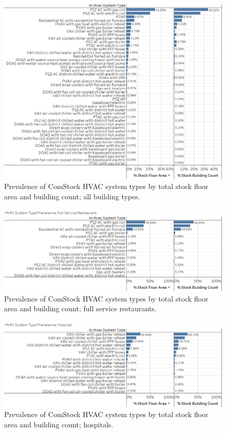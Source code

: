 \begin{figure}
    \centering \includegraphics[width=1.0\textwidth]{figures/hvac_system_type_prevalance.png}
    \caption[HVAC system type prevalence in all building types]{Prevalence of ComStock HVAC system types by total stock floor area and building count; all building types.}
    \label{fig:hvac_sys_type_prevalence}
\end{figure}

\begin{figure}
    \centering \includegraphics[width=1.0\textwidth]{figures/HVAC_SYS_Type_PREV_FSR.png}
    \caption[HVAC system type prevalence in full service restaurants]{Prevalence of ComStock HVAC system types by total stock floor area and building count; full service restaurants.}
    \label{fig:hvac_sys_type_prevalence_fsr}
\end{figure}

\begin{figure}
    \centering \includegraphics[width=1.0\textwidth]{figures/HVAC_SYS_Type_PREV_HOS.png}
    \caption[HVAC system type prevalence in hospitals]{Prevalence of ComStock HVAC system types by total stock floor area and building count; hospitals.}
    \label{fig:hvac_sys_type_prevalence_hos}
\end{figure}

